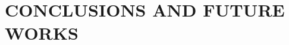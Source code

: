 \documentclass[sigconf]{acmart}
\begin{document}
\section{CONCLUSIONS AND FUTURE WORKS}










\end{document}
